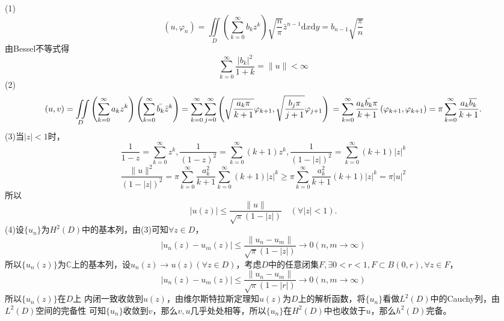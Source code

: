 \documentclass[lang=cn,newtx,10pt,scheme=chinese,thmcnt=chapter]{elegantbook}
\newcommand{\dif}{\mathrm{d}}
\begin{document}
\begin{solution}
(1)\begin{equation*}
(u,\varphi_n)=\iint\limits_{D} \left(\sum\limits_{k=0}^{\infty} b_k z^k\right)\sqrt{\frac{n}{\pi}}\bar{z}^{n-1} \dif x\dif y=b_{n-1}\sqrt{\frac{\pi}{n}}
\end{equation*}
由Bessel不等式得
\[
\sum_{k=0}^{\infty} \frac{\left|b_k\right|^2}{1+k}=\|u\|<\infty
\]
(2)\begin{equation*}
(u,v)=\iint\limits_{D}\left(\sum\limits_{k=0}^{\infty} a_k z^k\right) \left(\sum\limits_{k=0}^{\infty} \bar{b_k} \bar{z}^k\right)=\sum\limits_{k=0}^\infty\sum\limits_{j=0}^\infty\left(
\sqrt{\frac{a_k\pi}{k+1}}\varphi_{k+1},\sqrt{\frac{b_j\pi}{j+1}}\varphi_{j+1}
\right)\\=\sum\limits_{k=0}^\infty\frac{a_k\bar{b_k}\pi}{k+1}\left(
\varphi_{k+1},\varphi_{k+1}
\right)=\pi \sum_{k=0}^{\infty} \frac{a_k \overline{b_k}}{k+1} .
\end{equation*}
(3)当$|z|<1$时，
\[
\frac{1}{1-z}=\sum\limits_{k=0}^\infty z^k,\frac{1}{(1-z)^2}=\sum\limits_{k=0}^\infty (k+1)z^k,\frac{1}{(1-|z|)^2}=\sum\limits_{k=0}^\infty (k+1)|z|^k
\]
\begin{equation*}
\frac{\|u\|^2}{(1-|z|)^2} =\pi  \sum_{k=0}^{\infty} \frac{a_k ^2}{k+1}\sum\limits_{k=0}^\infty (k+1)|z|^k\geqslant \pi\sum_{k=0}^{\infty} \frac{a_k ^2}{k+1} (k+1)|z|^k=\pi |u|^2
\end{equation*}
所以\begin{equation*}
|u(z)| \leqslant \frac{\|u\|}{\sqrt{\pi}(1-|z|)} \quad(\forall|z|<1) .
\end{equation*}
(4)设$\{u_n\}$为$H^2(D)$中的基本列，由(3)可知$\forall z\in D$，
\begin{equation*}
|u_n(z)-u_m(z)| \leqslant \frac{\|u_n-u_m\|}{\sqrt{\pi}(1-|z|)} \to 0(n,m\to \infty)
\end{equation*}
所以$\{u_n(z)\}$为$\mathbb{C}$上的基本列，设$u_n(z)\to u(z)(\forall z\in D)$，考虑$D$中的任意闭集$F,\exists 0<r<1,F\subset B(0,r),\forall z\in F$，
\begin{equation*}
|u_n(z)-u_m(z)| \leqslant \frac{\|u_n-u_m\|}{\sqrt{\pi}(1-|r|)} \to 0(n,m\to \infty)
\end{equation*}
所以$\{u_n(z)\}$在$D$上 内闭一致收敛到$u(z)$，由维尔斯特拉斯定理知$u(z)$为$D$上的解析函数，将$\{u_n\}$看做$L^2(D)$中的Cauchy列，由$L^2(D)$空间的完备性 可知$\{u_n\}$收敛到$v$，那么$v,u$几乎处处相等，所以$\{u_n\}$在$H^2(D)$中也收敛于$u$，那么$h^2(D)$完备。
\end{solution}
\end{document}
